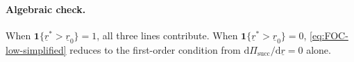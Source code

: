 \paragraph{Algebraic check.}
When $\mathbf{1}\{\underline{r}^{*}>\underline{r}_0\}=1$, all three lines
contribute.
When $\mathbf{1}\{\underline{r}^{*}>\underline{r}_0\}=0$,
\eqref{eq:FOC-low-simplified} reduces to the first-order condition from
$\mathrm d\Pi_{\text{succ}}/\mathrm d\underline{r}=0$ alone.
